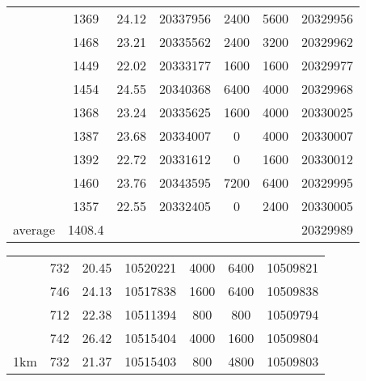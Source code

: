 \documentclass[a4paper,11pt]{article}
\begin{document}
{\begin{center}
\begin{tabular}{|c|c|c|c|c|c|c|}
           &       1369 &      24.12 &   20337956 &       2400 &       5600 &   20329956 \\

           &       1468 &      23.21 &   20335562 &       2400 &       3200 &   20329962 \\

           &       1449 &      22.02 &   20333177 &       1600 &       1600 &   20329977 \\

           &       1454 &      24.55 &   20340368 &       6400 &       4000 &   20329968 \\

           &       1368 &      23.24 &   20335625 &       1600 &       4000 &   20330025 \\

           &       1387 &      23.68 &   20334007 &          0 &       4000 &   20330007 \\

           &       1392 &      22.72 &   20331612 &          0 &       1600 &   20330012 \\

           &       1460 &      23.76 &   20343595 &       7200 &       6400 &   20329995 \\

           &       1357 &      22.55 &   20332405 &          0 &       2400 &   20330005 \\
\hline %
   average &     1408.4 &            &            &            &            &   20329989 \\
\hline %
\end{tabular} 
\begin{tabular}{|c|c|c|c|c|c|c|}
\hline %
 &        732 &      20.45 &   10520221 &       4000 &       6400 &   10509821 \\

           &        746 &      24.13 &   10517838 &       1600 &       6400 &   10509838 \\

           &        712 &      22.38 &   10511394 &        800 &        800 &   10509794 \\

           &        742 &      26.42 &   10515404 &       4000 &       1600 &   10509804 \\

 1km       &        732 &      21.37 &   10515403 &        800 &       4800 &   10509803 \\


\end{tabular}
\end{center}}
\end{document}
